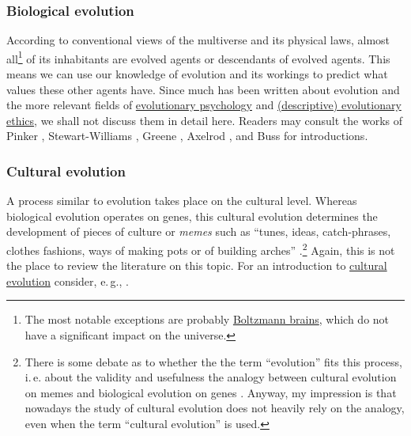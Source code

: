 \subsubsection{Biological evolution}\label{biological-evolution}

According to conventional views of the multiverse and its physical laws,
almost all\footnote{The most notable exceptions are probably
  \href{https://en.wikipedia.org/wiki/Boltzmann_brain}{Boltzmann
  brains}, which do not have a significant impact on the universe.} of
its inhabitants are evolved agents or descendants of evolved agents.
This means we can use our knowledge of evolution and its workings to
predict what values these other agents have. Since much has been written
about evolution and the more relevant fields of
\href{https://en.wikipedia.org/wiki/Evolutionary_psychology}{evolutionary
psychology} and
\href{https://en.wikipedia.org/wiki/Evolutionary_ethics\#Descriptive_evolutionary_ethics}{(descriptive)
evolutionary ethics}, we shall not discuss them in detail here. Readers
may consult the works of Pinker \citeyear{Pinker1999-dd},
Stewart-Williams \citeyear{Stewart-Williams2015-io},
Greene \citeyear{Greene2013-sq},
Axelrod \citeyear{Axelrod2006-ci}, and
Buss \citeyear{Buss2015-kp} for introductions.

\subsubsection{Cultural evolution}\label{cultural-evolution}

A process similar to evolution takes place on the cultural level.
Whereas biological evolution operates on genes, this cultural evolution
determines the development of pieces of culture or \emph{memes} such as
``tunes, ideas, catch-phrases, clothes fashions, ways of making pots or
of building arches'' \parencite{Dawkins1976-cd}.\footnote{There
  is some debate as to whether the the term ``evolution'' fits this
  process, i.\,e. about the validity and usefulness the analogy between
  cultural evolution on memes and biological evolution on genes
  \parencite{Edmonds2005-mi,Kuper_undated-zl,Gil-White2005-wt,Wimsatt1999-fy,Claidiere2012-gz,Atran2001-lb,Pinker1999-dd}.
  Anyway, my impression is that nowadays the study of cultural evolution
  does not heavily rely on the analogy, even when the term ``cultural
  evolution'' is used.} Again, this is not the place to review the
literature on this topic. For an introduction to
\href{https://en.wikipedia.org/wiki/Cultural_evolution}{cultural
evolution} consider, e.\,g., \parencite{Henrich2015-xe}.

